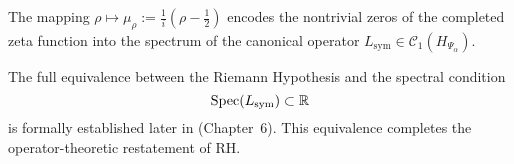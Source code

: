 \begin{remark}
\label{rmk:rh_equivalence_forward_ref}
The mapping \( \rho \mapsto \mu_\rho := \frac{1}{i}(\rho - \tfrac{1}{2}) \) encodes the nontrivial zeros of the completed zeta function into the spectrum of the canonical operator \( L_{\mathrm{sym}} \in \mathcal{C}_1(H_{\Psi_\alpha}) \). 

The full equivalence between the Riemann Hypothesis and the spectral condition
\[
\operatorname{Spec}(L_{\mathrm{sym}}) \subset \mathbb{R}
\]
is formally established later in  (Chapter~6). This equivalence completes the operator-theoretic restatement of RH.
\end{remark}
